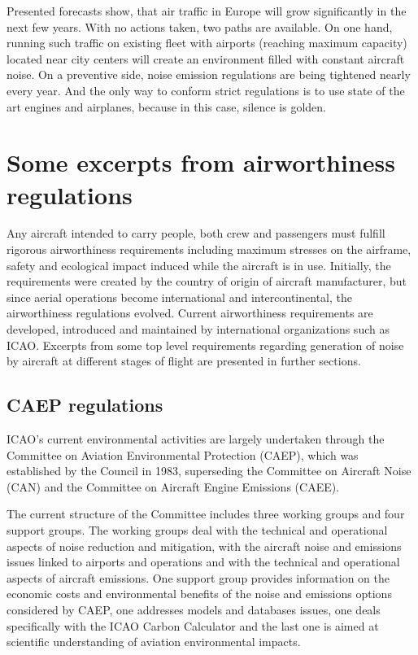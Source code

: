 Presented forecasts show, that air traffic in Europe will grow significantly in the next few years. With no actions taken, two paths are available. On one hand, running such traffic on existing fleet with airports (reaching maximum capacity) located near city centers will create an environment filled with constant aircraft noise. On a preventive side, noise emission regulations are being tightened nearly every year. And the only way to conform strict regulations is to use state of the art engines and airplanes, because in this case, silence is golden.

\section{Some excerpts from airworthiness regulations}

Any aircraft intended to carry people, both crew and passengers must fulfill rigorous airworthiness requirements including maximum stresses on the airframe, safety and ecological impact induced while the aircraft is in use. Initially, the requirements were created by the country of origin of aircraft manufacturer, but since aerial operations become international and intercontinental, the airworthiness regulations evolved. Current airworthiness requirements are developed, introduced and maintained by international organizations such as ICAO. Excerpts from some top level requirements regarding generation of noise by aircraft at different stages of flight are presented in further sections.

\subsection{CAEP regulations}

ICAO's current environmental activities are largely undertaken through the Committee on Aviation Environmental Protection (CAEP), which was established by the Council in 1983, superseding the Committee on Aircraft Noise (CAN) and the Committee on Aircraft Engine Emissions (CAEE).

The current structure of the Committee includes three working groups and four support groups. The working groups deal with the technical and operational aspects of noise reduction and mitigation, with the aircraft noise and emissions issues linked to airports and operations and with the technical and operational aspects of aircraft emissions. One support group provides information on the economic costs and environmental benefits of the noise and emissions options considered by CAEP, one addresses models and databases issues, one deals specifically with the ICAO Carbon Calculator and the last one is aimed at scientific understanding of aviation environmental impacts.
 
